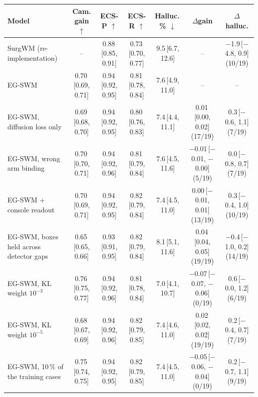 \begin{tabular}{lcccccc}
\toprule
Model & Cam. gain $\uparrow$ & ECS-P $\uparrow$ & ECS-R $\uparrow$ & Halluc.\,\% $\downarrow$ & $\Delta$gain & $\Delta$halluc. \\
\midrule
SurgWM (re-implementation) & -- & 0.88\,{\scriptsize[0.85, 0.91]} & 0.73\,{\scriptsize[0.70, 0.77]} & 9.5\,{\scriptsize[6.7, 12.6]} & -- & $-$1.9\,{\scriptsize[$-$4.8, 0.9]} (10/19) \\
EG-SWM & 0.70\,{\scriptsize[0.69, 0.71]} & 0.94\,{\scriptsize[0.92, 0.95]} & 0.81\,{\scriptsize[0.78, 0.84]} & 7.6\,{\scriptsize[4.9, 11.0]} & -- & -- \\
EG-SWM, diffusion loss only & 0.69\,{\scriptsize[0.68, 0.70]} & 0.94\,{\scriptsize[0.92, 0.95]} & 0.80\,{\scriptsize[0.76, 0.83]} & 7.4\,{\scriptsize[4.4, 11.1]} & 0.01\,{\scriptsize[0.00, 0.02]} (17/19) & 0.3\,{\scriptsize[$-$0.6, 1.1]} (7/19) \\
EG-SWM, wrong arm binding & 0.70\,{\scriptsize[0.70, 0.71]} & 0.94\,{\scriptsize[0.92, 0.96]} & 0.81\,{\scriptsize[0.79, 0.84]} & 7.6\,{\scriptsize[4.5, 11.6]} & $-$0.01\,{\scriptsize[$-$0.01, $-$0.00]} (5/19) & 0.0\,{\scriptsize[$-$0.8, 0.7]} (7/19) \\
EG-SWM + console readout & 0.70\,{\scriptsize[0.69, 0.71]} & 0.94\,{\scriptsize[0.92, 0.95]} & 0.82\,{\scriptsize[0.79, 0.84]} & 7.4\,{\scriptsize[4.5, 11.0]} & 0.00\,{\scriptsize[$-$0.01, 0.01]} (13/19) & 0.3\,{\scriptsize[$-$0.4, 1.0]} (10/19) \\
EG-SWM, boxes held across detector gaps & 0.65\,{\scriptsize[0.65, 0.66]} & 0.93\,{\scriptsize[0.91, 0.95]} & 0.82\,{\scriptsize[0.79, 0.84]} & 8.1\,{\scriptsize[5.1, 11.6]} & 0.04\,{\scriptsize[0.04, 0.05]} (19/19) & $-$0.4\,{\scriptsize[$-$1.0, 0.2]} (14/19) \\
EG-SWM, KL weight $10^{-3}$ & 0.76\,{\scriptsize[0.75, 0.77]} & 0.94\,{\scriptsize[0.92, 0.96]} & 0.81\,{\scriptsize[0.78, 0.84]} & 7.0\,{\scriptsize[4.1, 10.7]} & $-$0.07\,{\scriptsize[$-$0.07, $-$0.06]} (0/19) & 0.6\,{\scriptsize[$-$0.0, 1.2]} (6/19) \\
EG-SWM, KL weight $10^{-5}$ & 0.68\,{\scriptsize[0.67, 0.69]} & 0.94\,{\scriptsize[0.92, 0.96]} & 0.82\,{\scriptsize[0.79, 0.85]} & 7.4\,{\scriptsize[4.6, 11.0]} & 0.02\,{\scriptsize[0.02, 0.02]} (19/19) & 0.2\,{\scriptsize[$-$0.4, 0.7]} (7/19) \\
EG-SWM, 10\,\% of the training cases & 0.75\,{\scriptsize[0.74, 0.75]} & 0.94\,{\scriptsize[0.92, 0.95]} & 0.82\,{\scriptsize[0.79, 0.85]} & 7.4\,{\scriptsize[4.5, 11.0]} & $-$0.05\,{\scriptsize[$-$0.06, $-$0.04]} (0/19) & 0.2\,{\scriptsize[$-$0.7, 1.1]} (9/19) \\

\end{tabular}
